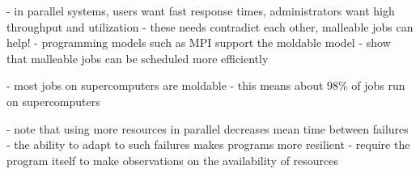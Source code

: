\cite{hungershofer2004combined}
- in parallel systems, users want fast response times, administrators want high throughput and utilization
- these needs contradict each other, malleable jobs can help!
- programming models such as MPI support the moldable model
- show that malleable jobs can be scheduled more efficiently

\cite{cirne2001model}
- most jobs on supercomputers are moldable
- this means about 98\% of jobs run on supercomputers

\cite{buisson2005framework}
- note that using more resources in parallel decreases mean time between failures
- the ability to adapt to such failures makes programs more resilient
- require the program itself to make observations on the availability of resources
